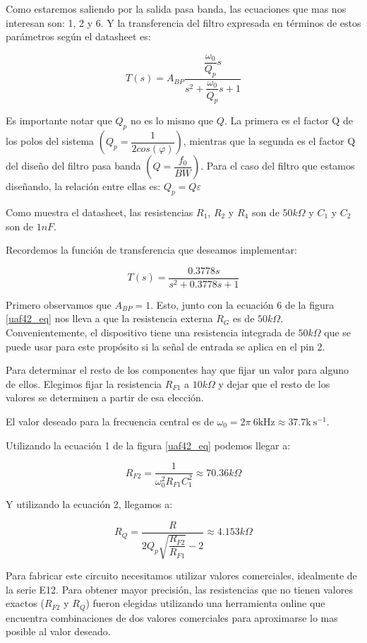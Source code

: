 \documentclass[11pt,a4paper]{report}
\begin{document}
Como estaremos saliendo por la salida pasa banda, las ecuaciones que mas nos interesan son: 1, 2 y 6.
Y la transferencia del filtro expresada en términos de estos parámetros según el datasheet es:

$$T(s) = A_{BP} \dfrac{ \dfrac{\omega_0}{Q_p} s}{s^2 + \dfrac{\omega_0}{Q_p}s + 1}$$

Es importante notar que $Q_p$ no es lo mismo que $Q$. La primera es el factor Q de los polos del sistema $\left( Q_p = \dfrac{1}{2 cos(\varphi)} \right)$, mientras que la segunda es el factor Q del diseño del filtro pasa banda $\left( Q = \dfrac{f_0}{BW} \right)$. Para el caso del filtro que estamos diseñando, la relación entre ellas es: $Q_p = Q \varepsilon$


Como muestra el datasheet, las resistencias $R_1$, $R_2$ y $R_4$ son de $50k\Omega$ y $C_1$ y $C_2$ son de $1nF$. 

Recordemos la función de transferencia que deseamos implementar:

$$T(s) = \dfrac{0.3778s}{s^2 +  0.3778s + 1}$$

Primero observamos que $A_{BP} = 1$. Esto, junto con la ecuación 6 de la figura \ref{uaf42_eq} nos lleva a que la resistencia externa $R_G$ es de $50k\Omega$. Convenientemente, el dispositivo tiene una resistencia integrada de $50k\Omega$ que se puede usar para este propósito si la señal de entrada se aplica en el pin 2.

Para determinar el resto de los componentes hay que fijar un valor para alguno de ellos. Elegimos fijar la resistencia $R_{F1}$ a $10k\Omega$ y dejar que el resto de los valores se determinen a partir de esa elección.

El valor deseado para la frecuencia central es de $\omega_0 = 2 \pi ~ 6\mathrm{kHz} \approx 37.7 \mathrm{k ~ s^{-1}}$.

Utilizando la ecuación 1 de la figura \ref{uaf42_eq} podemos llegar a:

$$R_{F2} = \dfrac{1}{\omega_0^2 R_{F1} C_1^2} \approx 70.36k\Omega$$

Y utilizando la ecuación 2, llegamos a:

$$R_Q = \dfrac{R}{2Q_p\sqrt{\dfrac{R_{F2}}{R_{F1}}} - 2} \approx 4.153 k\Omega$$

Para fabricar este circuito necesitamos utilizar valores comerciales, idealmente de la serie E12. Para obtener mayor precisión, las resistencias que no tienen valores exactos ($R_{F2}$ y $R_Q$) fueron elegidas utilizando una herramienta online \cite{res_calc} que encuentra combinaciones de dos valores comerciales para aproximarse lo mas posible al valor deseado.
\end{document}
